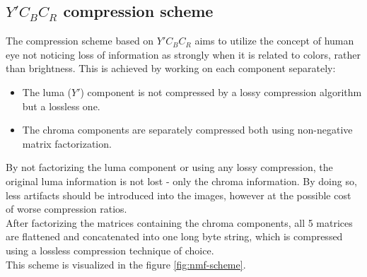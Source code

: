 \documentclass[thesis=M,english]{FITthesis}[2012/10/20]
\begin{document}
\subsection{$Y'C_BC_R$ compression scheme}
The compression scheme based on $Y'C_BC_R$ aims to utilize the concept
of human eye not noticing loss of information as strongly when it is related
to colors, rather than brightness. This is achieved by working on each component
separately:
\\

\begin{itemize}
  \item The luma ($Y'$) component is not compressed by a lossy compression algorithm but
        a lossless one.
  \item The chroma components are separately compressed both using non-negative
   matrix factorization.
\end{itemize}

By not factorizing the luma component or using any lossy compression, the original luma
information is not lost - only the chroma information. By doing so, less artifacts should
be introduced into the images, however at the possible cost of worse compression ratios.
\\

After factorizing the matrices containing the chroma components, all 5 matrices are flattened
and concatenated into one long byte string, which is compressed using a lossless compression
technique of choice.
\\

This scheme is visualized in the figure \ref{fig:nmf-scheme}.
\end{document}
